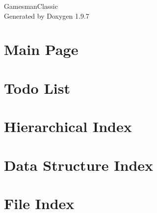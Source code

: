 \documentclass[twoside]{book}
\newcommand{\+}{\discretionary{\mbox{\scriptsize$\hookleftarrow$}}{}{}}
\newcommand{\clearemptydoublepage}{%
    \newpage{\pagestyle{empty}\cleardoublepage}%
  }
\begin{document}
  \raggedbottom
    \hypersetup{pageanchor=false,
                bookmarksnumbered=true,
                pdfencoding=unicode
               }
  \begin{titlepage}
  \vspace*{7cm}
  \begin{center}%
  {\Large Gamesman\+Classic}\\
  \vspace*{1cm}
  {\large Generated by Doxygen 1.9.7}\\
  \end{center}
  \end{titlepage}
  \clearemptydoublepage
  \tableofcontents
  \clearemptydoublepage
  \hypersetup{pageanchor=true}
\chapter{Main Page}
\label{index}\hypertarget{index}{}
\chapter{Todo List}
\label{todo}

\chapter{Hierarchical Index}

\chapter{Data Structure Index}

\chapter{File Index}

\end{document}
